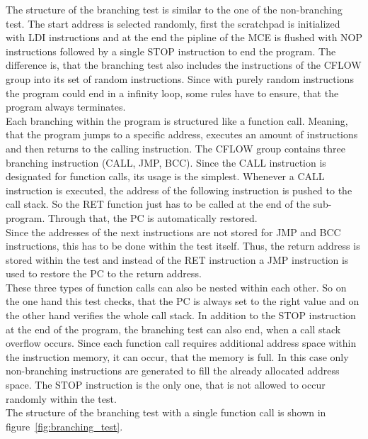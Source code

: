 The structure of the branching test is similar to the one of the non-branching test. The start address is selected randomly, first the scratchpad is initialized
with LDI instructions and at the end the pipline of the MCE is flushed with NOP instructions followed by a single STOP instruction to end the program.
The difference is, that the branching test also includes the instructions of the CFLOW group into its set of random instructions.
Since with purely random instructions the program could end in a infinity loop, some rules have to ensure, that the program always terminates.\\
Each branching within the program is structured like a function call. Meaning, that the program jumps to a specific address, executes an amount of instructions
and then returns to the calling instruction.
The CFLOW group contains three branching instruction (CALL, JMP, BCC). Since the CALL instruction is designated for function calls, its usage is the simplest.
Whenever a CALL instruction is executed, the address of the following instruction is pushed to the call stack. So the RET function just has to be called at the
end of the sub-program. Through that, the PC is automatically restored.\\
Since the addresses of the next instructions are not stored for JMP and BCC instructions, this has to be done within the test itself.
Thus, the return address is stored within the test and instead of the RET instruction a JMP instruction is used to restore the PC to the return address.\\
These three types of function calls can also be nested within each other. 
So on the one hand this test checks, that the PC is always set to the right value and on the other hand verifies the whole call stack.
In addition to the STOP instruction at the end of the program, the branching test can also end, when a call stack overflow occurs.
Since each function call requires additional address space within the instruction memory, it can occur, that the memory is full.
In this case only non-branching instructions are generated to fill the already allocated address space.
The STOP instruction is the only one, that is not allowed to occur randomly within the test.\\
The structure of the branching test with a single function call is shown in figure~\ref{fig:branching_test}.

